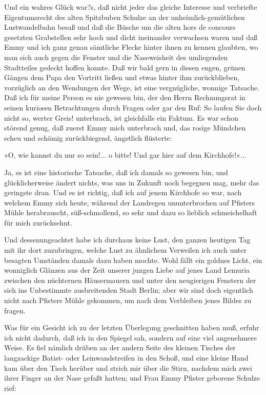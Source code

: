 Und ein wahres Glück war?s, daß nicht jeder das gleiche Interesse
und verbriefte Eigentumsrecht des alten Spitzbuben Schulze an der
unheimlich-gemütlichen Lustwandelbahn besaß und daß die Büsche um
die alten hors de concours gesetzten Grabstellen sehr hoch und
dicht ineinander verwachsen waren und daß Emmy und ich ganz genau
sämtliche Flecke hinter ihnen zu kennen glaubten, wo man sich auch
gegen die Fenster und die Naseweisheit des umliegenden Stadtteiles
gedeckt hoffen konnte. Daß wir bald gern in diesen engen, grünen
Gängen dem Papa den Vortritt ließen und etwas hinter ihm
zurückblieben, vorzüglich an den Wendungen der Wege, ist eine
vergnügliche, wonnige Tatsache. Daß ich für meine Person es nie
gewesen bin, der den Herrn Rechnungsrat in seinen kuriosen
Betrachtungen durch Fragen oder gar den Ruf: So laufen Sie doch
nicht so, werter Greis! unterbrach, ist gleichfalls ein Faktum. Es
war schon störend genug, daß zuerst Emmy mich unterbrach und, das
rosige Mündchen scheu und schämig zurückbiegend, ängstlich
flüsterte:

»O, wie kannst du nur so sein!... o bitte! Und gar hier auf dem
Kirchhofe!«...

Ja, es ist eine historische Tatsache, daß ich damals so gewesen
bin, und glücklicherweise ändert nichts, was uns in Zukunft noch
begegnen mag, mehr das geringste dran. Und es ist richtig, daß ich
auf jenem Kirchhofe so war, nach welchem Emmy sich heute, während
der Landregen ununterbrochen auf Pfisters Mühle herabrauscht,
süß-schmollend, so sehr und dazu so lieblich schmeichelhaft für
mich zurücksehnt.

Und dessenungeachtet habe ich durchaus keine Lust, den ganzen
heutigen Tag mit ihr dort zuzubringen, welche Lust zu ähnlichem
Verweilen ich auch unter besagten Umständen damals dazu haben
mochte. Wohl fällt ein goldnes Licht, ein wonniglich Glänzen aus
der Zeit unserer jungen Liebe auf jenes Land Lemuria zwischen den
nüchternen Häusermauern und unter den neugierigen Fenstern der sich
ins Unbestimmte ausbreitenden Stadt Berlin; aber wir sind doch
eigentlich nicht nach Pfisters Mühle gekommen, um nach dem
Verbleiben jenes Bildes zu fragen.

Was für ein Gesicht ich zu der letzten Überlegung geschnitten haben
muß, erfuhr ich nicht dadurch, daß ich in den Spiegel sah, sondern
auf eine viel angenehmere Weise. Es fiel nämlich drüben an der
andern Seite des kleinen Tisches der langzackige Batist- oder
Leinwandstreifen in den Schoß, und eine kleine Hand kam über den
Tisch herüber und strich mir über die Stirn, nachdem mich zwei
ihrer Finger an der Nase gefaßt hatten; und Frau Emmy Pfister
geborene Schulze rief:

